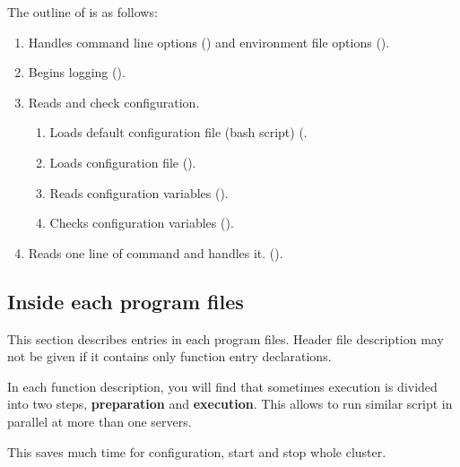   The outline of  is as follows:
  
  {
  	  \raggedright
	  \begin{enumerate}
		  \item Handles command line options () and environment
				file options ().
		  \item Begins logging ().
		  \item Reads and check configuration.
				\begin{enumerate}
				\item Loads default configuration file (bash script)
					(.
				\item Loads configuration file ().
				\item Reads configuration variables ().
				\item Checks configuration variables ().
				\end{enumerate}
		  \item Reads one line of command and handles it. ().
	  \end{enumerate}
  }



\subsection{Inside each program files}

  This section describes entries in each program files.
  Header file description may not be given if it contains only function entry declarations.
  
  In each function description, you will find that sometimes execution is
  divided into two steps,
  \textbf{preparation} and \textbf{execution}.
  This allows to run similar  script in parallel at more than one servers.
  
  This saves much time for configuration, start and stop whole \XC{} cluster.
  



